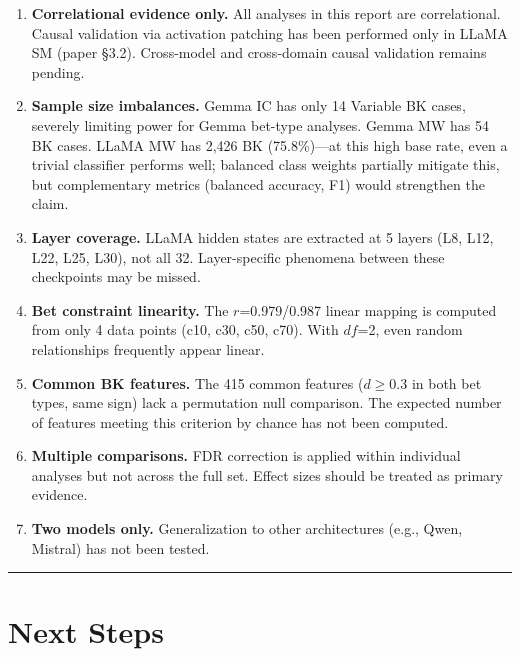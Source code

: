 \documentclass[11pt,a4paper]{article}
\begin{document}
\begin{enumerate}[leftmargin=2em]
    \item \textbf{Correlational evidence only.} All analyses in this report are correlational. Causal validation via activation patching has been performed only in LLaMA SM (paper \S3.2). Cross-model and cross-domain causal validation remains pending.

    \item \textbf{Sample size imbalances.} Gemma IC has only 14 Variable BK cases, severely limiting power for Gemma bet-type analyses. Gemma MW has 54 BK cases. LLaMA MW has 2{,}426 BK (75.8\%)---at this high base rate, even a trivial classifier performs well; balanced class weights partially mitigate this, but complementary metrics (balanced accuracy, F1) would strengthen the claim.

    \item \textbf{Layer coverage.} LLaMA hidden states are extracted at 5 layers (L8, L12, L22, L25, L30), not all 32. Layer-specific phenomena between these checkpoints may be missed.

    \item \textbf{Bet constraint linearity.} The $r$=0.979/0.987 linear mapping is computed from only 4 data points (c10, c30, c50, c70). With $df$=2, even random relationships frequently appear linear.

    \item \textbf{Common BK features.} The 415 common features ($d$$\geq$0.3 in both bet types, same sign) lack a permutation null comparison. The expected number of features meeting this criterion by chance has not been computed.

    \item \textbf{Multiple comparisons.} FDR correction is applied within individual analyses but not across the full set. Effect sizes should be treated as primary evidence.

    \item \textbf{Two models only.} Generalization to other architectures (e.g., Qwen, Mistral) has not been tested.
\end{enumerate}

\bigskip\hrule\bigskip

\section{Next Steps}
\end{document}
